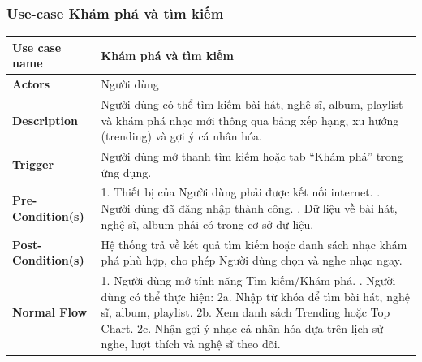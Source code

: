 \documentclass[a4paper]{article}
\newcommand{\cach}{\hspace*{1.5em}\ignorespaces}
\begin{document}
\subsubsection{Use-case Khám phá và tìm kiếm}
\begin{table}[H]
	\centering
	\renewcommand{\arraystretch}{1.3} %
	\begin{tabularx}{\textwidth}{|l|X|}
		\hline
		\textbf{Use case name} & Khám phá và tìm kiếm                                                                                                                                 \\ \hline
		\textbf{Actors}        & Người dùng                                                                                                                                           \\ \hline
		\textbf{Description}   & Người dùng có thể tìm kiếm bài hát, nghệ sĩ, album, playlist và khám phá nhạc mới thông qua bảng xếp hạng, xu hướng (trending) và gợi ý cá nhân hóa. \\ \hline
		\textbf{Trigger}       & Người dùng mở thanh tìm kiếm hoặc tab “Khám phá” trong ứng dụng.                                                                                     \\ \hline
		\textbf{Pre-Condition(s)}
		                       & 1. Thiết bị của Người dùng phải được kết nối internet. \newline
		2. Người dùng đã đăng nhập thành công. \newline 
		3. Dữ liệu về bài hát, nghệ sĩ, album phải có trong cơ sở dữ liệu.                                                                                                            \\ \hline
		\textbf{Post-Condition(s)}
		                       & Hệ thống trả về kết quả tìm kiếm hoặc danh sách nhạc khám phá phù hợp, cho phép Người dùng chọn và nghe nhạc ngay.                                   \\ \hline
		\textbf{Normal Flow}
		                       & 1. Người dùng mở tính năng Tìm kiếm/Khám phá. \newline
		2. Người dùng có thể thực hiện: \newline
		\cach 2a. Nhập từ khóa để tìm bài hát, nghệ sĩ, album, playlist. \newline
		\cach 2b. Xem danh sách Trending hoặc Top Chart. \newline
		\cach 2c. Nhận gợi ý nhạc cá nhân hóa dựa trên lịch sử nghe, lượt thích và nghệ sĩ theo dõi. \newline

\end{tabularx}
\end{table}
\end{document}
